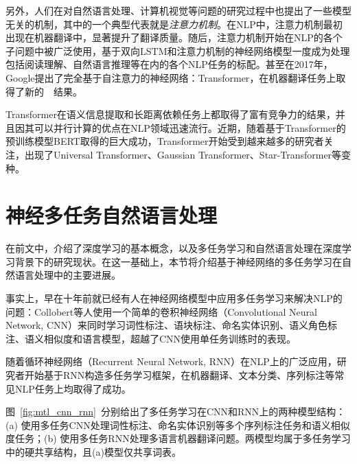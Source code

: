 另外，人们在对自然语言处理、计算机视觉等问题的研究过程中也提出了一些模型无关的机制，其中的一个典型代表就是\emph{注意力机制}。在NLP中，注意力机制最初出现在机器翻译中，显著提升了翻译质量\cite{DBLP:journals/corr/BahdanauCB14}。随后，注意力机制开始在NLP的各个子问题中被广泛使用，基于双向LSTM和注意力机制的神经网络模型一度成为处理包括阅读理解、自然语言推理等在内的各个NLP任务的标配。甚至在2017年，Google提出了完全基于自注意力的神经网络：Transformer\cite{DBLP:conf/nips/VaswaniSPUJGKP17}，在机器翻译任务上取得了新的~\sArt~结果。


Transformer在语义信息提取和长距离依赖任务上都取得了富有竞争力的结果\cite{DBLP:conf/emnlp/TangMRS18}，并且因其可以并行计算的优点在NLP领域迅速流行。近期，随着基于Transformer的预训练模型BERT\cite{devlin2018bert}取得的巨大成功，Transformer开始受到越来越多的研究者关注，出现了Universal Transformer\cite{dehghani2018universal}、Gaussian Transformer\cite{guo2019gaussian}、Star-Transformer\cite{guo2019star}等变种。


\section{神经多任务自然语言处理}
\label{sec:mtl4nlp}
在前文中，介绍了深度学习的基本概念，以及多任务学习和自然语言处理在深度学习背景下的研究现状。在这一基础上，本节将介绍基于神经网络的多任务学习在自然语言处理中的主要进展。

事实上，早在十年前就已经有人在神经网络模型中应用多任务学习来解决NLP的问题：Collobert等人\cite{DBLP:conf/icml/CollobertW08}使用一个简单的卷积神经网络（Convolutional Neural Network, CNN）来同时学习词性标注、语块标注、命名实体识别、语义角色标注、语义相似度和语言模型，超越了CNN使用单任务训练时的表现。

随着循环神经网络（Recurrent Neural Network, RNN）在NLP上的广泛应用，研究者开始基于RNN构造多任务学习框架，在机器翻译\cite{DBLP:conf/acl/DongWHYW15}、文本分类\cite{DBLP:conf/ijcai/LiuQH16}\cite{DBLP:conf/acl/LiuQH17}、序列标注\cite{DBLP:conf/acl/SogaardG16}等常见NLP任务上均取得了成功。

图~\ref{fig:mtl_cnn_rnn}~分别给出了多任务学习在CNN和RNN上的两种模型结构：(a) 使用多任务CNN处理词性标注、命名实体识别等多个序列标注任务和语义相似度任务；(b) 使用多任务RNN处理多语言机器翻译问题。两模型均属于多任务学习中的硬共享结构，且(a)模型仅共享词表。

